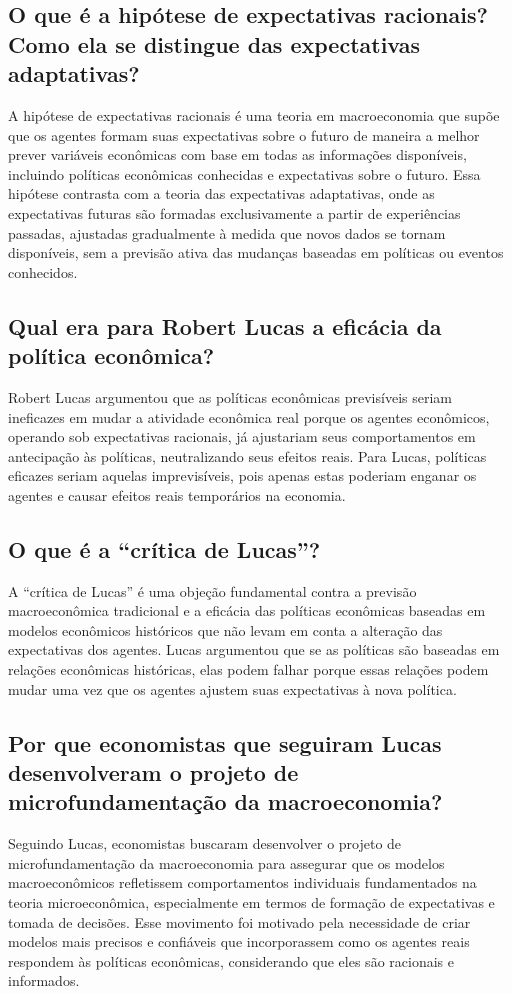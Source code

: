 \documentclass[a4paper,12pt]{article}[abntex2]
\begin{document}
\subsection{\textbf{O que é a hipótese de expectativas racionais? Como ela se distingue das expectativas adaptativas?}}
A hipótese de expectativas racionais é uma teoria em macroeconomia que supõe que os agentes formam suas expectativas sobre o futuro de maneira a melhor prever variáveis econômicas com base em todas as informações disponíveis, incluindo políticas econômicas conhecidas e expectativas sobre o futuro. Essa hipótese contrasta com a teoria das expectativas adaptativas, onde as expectativas futuras são formadas exclusivamente a partir de experiências passadas, ajustadas gradualmente à medida que novos dados se tornam disponíveis, sem a previsão ativa das mudanças baseadas em políticas ou eventos conhecidos.

\subsection{\textbf{Qual era para Robert Lucas a eficácia da política econômica?}}
Robert Lucas argumentou que as políticas econômicas previsíveis seriam ineficazes em mudar a atividade econômica real porque os agentes econômicos, operando sob expectativas racionais, já ajustariam seus comportamentos em antecipação às políticas, neutralizando seus efeitos reais. Para Lucas, políticas eficazes seriam aquelas imprevisíveis, pois apenas estas poderiam enganar os agentes e causar efeitos reais temporários na economia.

\subsection{\textbf{O que é a “crítica de Lucas”?}}
A “crítica de Lucas” é uma objeção fundamental contra a previsão macroeconômica tradicional e a eficácia das políticas econômicas baseadas em modelos econômicos históricos que não levam em conta a alteração das expectativas dos agentes. Lucas argumentou que se as políticas são baseadas em relações econômicas históricas, elas podem falhar porque essas relações podem mudar uma vez que os agentes ajustem suas expectativas à nova política.

\subsection{\textbf{Por que economistas que seguiram Lucas desenvolveram o projeto de microfundamentação da macroeconomia?}}
Seguindo Lucas, economistas buscaram desenvolver o projeto de microfundamentação da macroeconomia para assegurar que os modelos macroeconômicos refletissem comportamentos individuais fundamentados na teoria microeconômica, especialmente em termos de formação de expectativas e tomada de decisões. Esse movimento foi motivado pela necessidade de criar modelos mais precisos e confiáveis que incorporassem como os agentes reais respondem às políticas econômicas, considerando que eles são racionais e informados.
\end{document}

